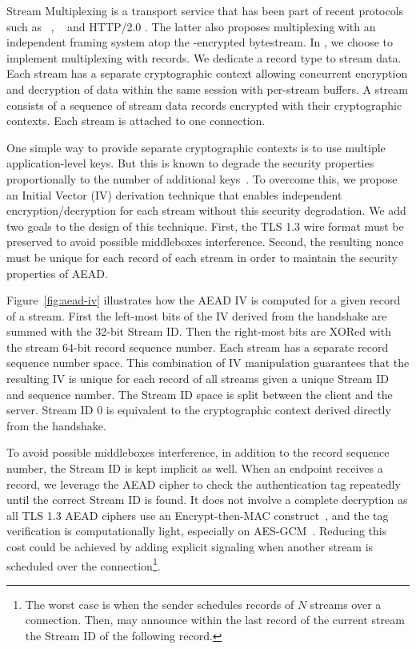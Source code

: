 Stream Multiplexing is a transport service that has been part of recent
protocols such as \sctp~\cite{rfc4960}, \quic~\cite{rfc9000} and HTTP/2.0
\cite{rfc7540}. The latter also proposes multiplexing with an independent
framing system atop the \tls-encrypted \tcp bytestream. In \tcpls, we choose to
implement multiplexing with \tcpls records. We dedicate a \tcpls record type to
\tcpls stream data. Each stream has a separate cryptographic context allowing
concurrent encryption and decryption of data within the same session with 
per-stream buffers. A \tcpls
stream consists of a sequence of \tcpls stream data records encrypted with their
cryptographic contexts. Each stream is attached to one \tcp connection.

One simple way to provide separate cryptographic contexts is to use multiple
application-level keys. But this is known to degrade the security properties
proportionally to the number of additional keys~\cite{chatterjee2011another}. To
overcome this, we propose an Initial Vector (IV) derivation technique that
enables independent encryption/decryption for each stream without this security
degradation. We add two goals to the design of this technique. First, the 
TLS 1.3 wire format must be preserved to avoid possible middleboxes 
interference. Second, the resulting nonce must be unique for each record of 
each stream in order to maintain the security properties of AEAD.

Figure~\ref{fig:aead-iv} illustrates how the AEAD IV is computed for a given
\tcpls record of a \tcpls stream. First the left-most bits of the IV derived
from the \tls handshake are summed with the 32-bit \tcpls Stream ID. Then the
right-most bits are XORed with the stream 64-bit record sequence number. Each
\tcpls stream has a separate record sequence number space. This combination of
IV manipulation guarantees that the resulting IV is unique for each record of
all \tcpls streams given a unique Stream ID and sequence number. The 
Stream ID space is split between the client
and the server. Stream ID 0 is equivalent to the cryptographic context
derived directly from the handshake.

To avoid possible middleboxes interference, in addition to the record sequence
number, the \tcpls Stream ID is kept implicit as well. When an endpoint receives
a \tcpls record, we leverage the AEAD cipher to check the authentication tag
repeatedly until the correct \tcpls Stream ID is found. 
It does not involve a complete decryption as all TLS 1.3 AEAD
ciphers use an Encrypt-then-MAC construct~\cite{rfc7366, rfc8446}, and the tag
verification is computationally light, especially on 
AES-GCM~\cite{mcgrew2004galois}. Reducing this cost could be achieved by adding 
explicit signaling when another stream is scheduled over the \tcp connection\footnote{
The worst case is when the sender schedules records of $N$ streams 
over a \tcp connection. Then,
  \tcpls may announce within the last record of the current stream the Stream 
  ID of the following record.%
}.

